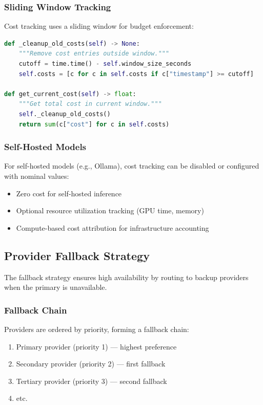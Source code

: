\subsubsection{Sliding Window Tracking}

Cost tracking uses a sliding window for budget enforcement:

\begin{lstlisting}[language=Python, caption={Sliding window cost tracking}, label=lst:sliding-window]
def _cleanup_old_costs(self) -> None:
    """Remove cost entries outside window."""
    cutoff = time.time() - self.window_size_seconds
    self.costs = [c for c in self.costs if c["timestamp"] >= cutoff]

def get_current_cost(self) -> float:
    """Get total cost in current window."""
    self._cleanup_old_costs()
    return sum(c["cost"] for c in self.costs)
\end{lstlisting}

\subsubsection{Self-Hosted Models}

For self-hosted models (e.g., Ollama), cost tracking can be disabled or configured with nominal values:

\begin{itemize}
    \item Zero cost for self-hosted inference
    \item Optional resource utilization tracking (GPU time, memory)
    \item Compute-based cost attribution for infrastructure accounting
\end{itemize}

\subsection{Provider Fallback Strategy}
\label{subsubsec:fallback-strategy}

The fallback strategy ensures high availability by routing to backup providers when the primary is unavailable.

\subsubsection{Fallback Chain}

Providers are ordered by priority, forming a fallback chain:

\begin{enumerate}
    \item Primary provider (priority 1) --- highest preference
    \item Secondary provider (priority 2) --- first fallback
    \item Tertiary provider (priority 3) --- second fallback
    \item etc.
\end{enumerate}

